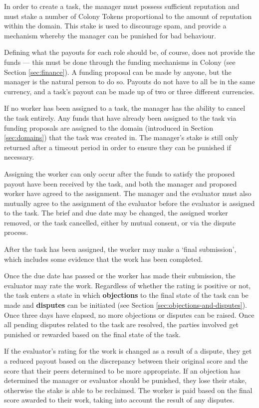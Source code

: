 In order to create a task, the manager must possess sufficient reputation and must stake a number of Colony Tokens proportional to the amount of reputation within the domain. This stake is used to discourage spam, and provide a mechanism whereby the manager can be punished for bad behaviour. 

Defining what the payouts for each role should be, of course, does not provide the funds --- this must be done through the funding mechanisms in Colony (see Section \ref{sec:finance}). A funding proposal can be made by anyone, but the manager is the natural person to do so. Payouts do not have to all be in the same currency, and a task's payout can be made up of two or three different currencies.

If no worker has been assigned to a task, the manager has the ability to cancel the task entirely. Any funds that have already been assigned to the task via funding proposals are assigned to the domain (introduced in Section \ref{sec:domains}) that the task was created in. The manager's stake is still only returned after a timeout period in order to ensure they can be punished if necessary. 

Assigning the worker can only occur after the funds to satisfy the proposed payout have been received by the task, and both the manager and proposed worker have agreed to the assignment. The manager and the evaluator must also mutually agree to the assignment of the evaluator before the evaluator is assigned to the task. The brief and due date may be changed, the assigned worker removed, or the task cancelled, either by mutual consent, or via the dispute process.

After the task has been assigned, the worker may make a `final submission', which includes some evidence that the work has been completed.

Once the due date has passed or the worker has made their submission, the evaluator may rate the work. Regardless of whether the rating is positive or not, the task enters a state in which \textbf{objections} to the final state of the task can be made and \textbf{disputes} can be initiated (see Section \ref{sec:objections-and-disputes}). Once three days have elapsed, no more objections or disputes can be raised. Once all pending disputes related to the task are resolved, the parties involved get punished or rewarded based on the final state of the task.

If the evaluator's rating for the work is changed as a result of a dispute, they get a reduced payout based on the discrepancy between their original score and the score that their peers determined to be more appropriate. If an objection has determined the manager or evaluator should be punished, they lose their stake, otherwise the stake is able to be reclaimed. The worker is paid based on the final score awarded to their work, taking into account the result of any disputes.

